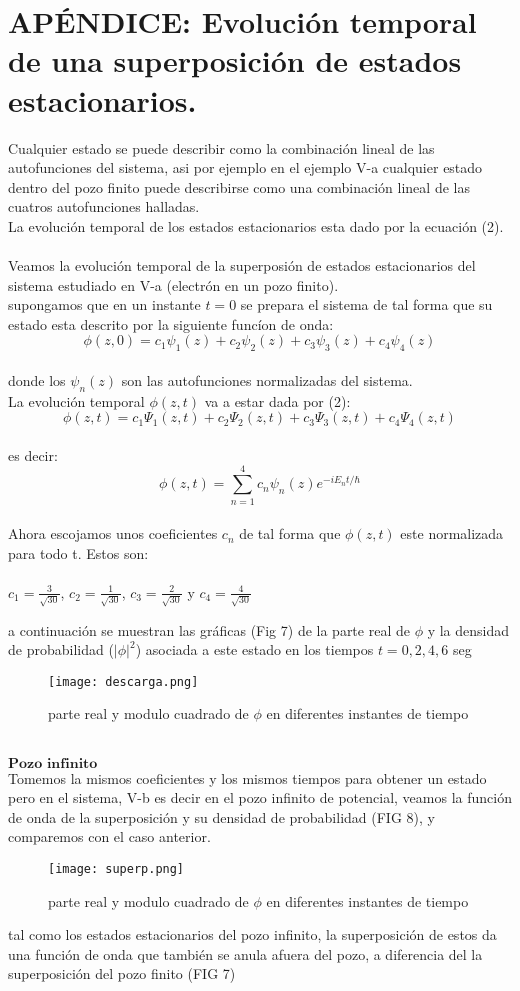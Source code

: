 \documentclass[9pt,twocolumn,twoside]{osajnl}
\begin{document}
\section*{APÉNDICE: Evolución temporal de una superposición de estados estacionarios.} 
Cualquier estado se puede describir como la combinación lineal de las autofunciones del sistema, asi por ejemplo en el ejemplo V-a cualquier estado dentro del pozo finito puede describirse como una combinación lineal de las cuatros autofunciones halladas.\\
La evolución temporal de los estados estacionarios esta dado por la ecuación (2).\\ \\
Veamos la evolución temporal de la superposión de estados estacionarios del sistema estudiado en V-a (electrón en un pozo finito). \\
supongamos que en un instante $t=0$ se prepara el sistema de tal forma que su estado esta descrito por la siguiente funcíon de onda:
$$\phi(z,0)=c_1\psi_1(z)+c_2\psi_2(z)+c_3\psi_3(z)+c_4\psi_4(z)$$ \\
donde los $\psi_n(z)$ son las autofunciones normalizadas del sistema.\\
La  evolución temporal $\phi(z,t)$ va a estar dada por (2): \\
$$\phi(z,t)=c_1\Psi_1(z,t)+c_2\Psi_2(z,t)+c_3\Psi_3(z,t)+c_4\Psi_4(z,t)$$ \\
es decir:
$$\phi(z,t)= \sum_{n=1}^4 c_n\psi_n(z)e^{-iE_nt/\hbar}$$ \\
Ahora escojamos unos coeficientes $c_n$ de tal forma que $\phi(z,t)$ este normalizada para todo t. Estos son:\\ \\
$c_1=\frac{3}{\sqrt{30}}$, \hspace{} $c_2=\frac{1}{\sqrt{30}}$, \hspace{}
$c_3=\frac{2}{\sqrt{30}}$ \hspace{} y  \hspace{}
$c_4=\frac{4}{\sqrt{30}}$

a continuación se muestran las gráficas (Fig 7) de la parte real de $\phi$ y la densidad de probabilidad ($|\phi|^2$) asociada a este estado en los tiempos $t=0, 2 , 4, 6$ seg
\begin{figure}[H]
    \centering
    \texttt{[image: descarga.png]}
    \caption{parte real y modulo cuadrado de $\phi$ en diferentes instantes de tiempo}
    \label{fig:my_label}
\end{figure}
\\
$\textbf{Pozo infinito}$ \\
Tomemos la mismos coeficientes y los mismos tiempos para obtener un  estado pero en el sistema, V-b es decir en el pozo infinito de potencial, veamos la función de onda de la superposición y su densidad de probabilidad (FIG 8), y comparemos con el caso anterior.
\begin{figure}[H]
    \centering
    \texttt{[image: superp.png]}
    \caption{parte real y modulo cuadrado de $\phi$ en diferentes instantes de tiempo}
    \label{fig:my_label}
\end{figure}

tal como los estados estacionarios del pozo infinito, la superposición de estos da una función de onda que también se anula afuera del pozo, a diferencia del la superposición del pozo finito (FIG 7)










\end{document}
